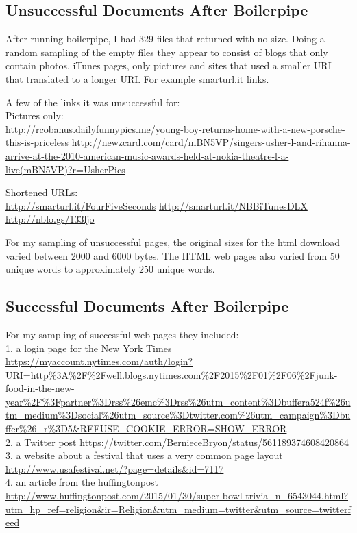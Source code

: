 \documentclass[12pt]{article}
\begin{document}
\subsection{Unsuccessful Documents After Boilerpipe}
After running boilerpipe, I had 329 files that returned with no size. Doing a random sampling of the empty files they appear to consist of blogs that only contain photos, iTunes pages, only pictures and sites that used a smaller URI that translated to a longer URI. For example \url{smarturl.it} links.

A few of the links it was unsuccessful for:\\
Pictures only:\\
\url{http://rcobanus.dailyfunnypics.me/young-boy-returns-home-with-a-new-porsche-this-is-priceless}
\url{http://newzcard.com/card/mBN5VP/singers-usher-l-and-rihanna-arrive-at-the-2010-american-music-awards-held-at-nokia-theatre-l-a-live(mBN5VP)?r=UsherPics}

Shortened URLs:\\
\url{http://smarturl.it/FourFiveSeconds}
\url{http://smarturl.it/NBBiTunesDLX}
\url{http://nblo.gs/133ljo}

For my sampling of unsuccessful pages, the original sizes for the html download varied between 2000 and 6000 bytes. The HTML web pages also varied from 50 unique words to approximately 250 unique words.

\subsection{Successful Documents After Boilerpipe}
For my sampling of successful web pages they included:\\
1. a login page for the New York Times \url{https://myaccount.nytimes.com/auth/login?URI=http%3A%2F%2Fwell.blogs.nytimes.com%2F2015%2F01%2F06%2Fjunk-food-in-the-new-year%2F%3Fpartner%3Drss%26emc%3Drss%26utm_content%3Dbuffera524f%26utm_medium%3Dsocial%26utm_source%3Dtwitter.com%26utm_campaign%3Dbuffer%26_r%3D5&REFUSE_COOKIE_ERROR=SHOW_ERROR}\\
2. a Twitter post \url{https://twitter.com/BernieceBryon/status/561189374608420864}\\
3. a website about a festival that uses a very common page layout \url{http://www.usafestival.net/?page=details&id=7117}\\
4. an article from the huffingtonpost \url{http://www.huffingtonpost.com/2015/01/30/super-bowl-trivia_n_6543044.html?utm_hp_ref=religion&ir=Religion&utm_medium=twitter&utm_source=twitterfeed}
\end{document}
